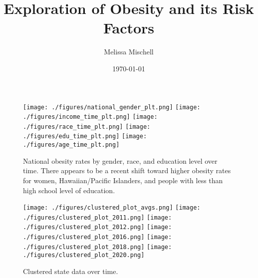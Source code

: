 \documentclass[11pt]{article}
\title{Exploration of Obesity and its Risk Factors}
\author{Melissa Mischell}
\date{\today}
\begin{document}
\maketitle

\begin{figure}[hp]
\texttt{[image: ./figures/national\_gender\_plt.png]}
\texttt{[image: ./figures/income\_time\_plt.png]}
\texttt{[image: ./figures/race\_time\_plt.png]}
\texttt{[image: ./figures/edu\_time\_plt.png]}
\texttt{[image: ./figures/age\_time\_plt.png]}
\caption{
  National obesity rates by gender, race, and education level over time. There appears to be a recent shift toward higher obesity rates for women, Hawaiian/Pacific Islanders, and people with less than high school level of education. 
}
\label{fig:dems_by_time}
\end{figure}

\begin{figure}[hp]
\texttt{[image: ./figures/clustered\_plot\_avgs.png]}
\texttt{[image: ./figures/clustered\_plot\_2011.png]}
\texttt{[image: ./figures/clustered\_plot\_2012.png]}
\texttt{[image: ./figures/clustered\_plot\_2016.png]}
\texttt{[image: ./figures/clustered\_plot\_2018.png]}
\texttt{[image: ./figures/clustered\_plot\_2020.png]}
\caption{
  Clustered state data over time.
}
\label{fig:dems_by_time}
\end{figure}
\end{document}
